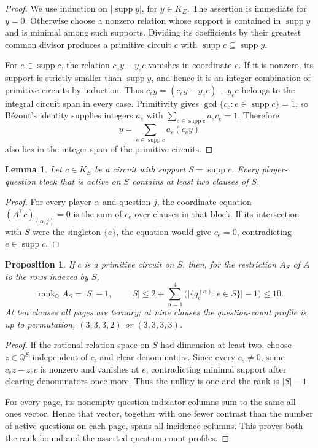 \documentclass[11pt]{article}
\newtheorem{proposition}[theorem]{Proposition}
\newtheorem{lemma}[theorem]{Lemma}
\theoremstyle{definition}
\theoremstyle{remark}
\newcommand{\Q}{\mathbb{Q}}
\newcommand{\supp}{\operatorname{supp}}
\newcommand{\rank}{\operatorname{rank}}
\newcommand{\card}[1]{\lvert #1\rvert}
\numberwithin{equation}{section}
\begin{document}
\begin{proof}
We use induction on \(\lvert\supp y\rvert\), for \(y\in K_E\).  The assertion
is immediate for \(y=0\).  Otherwise choose a nonzero relation whose support
is contained in \(\supp y\) and is minimal among such supports.  Dividing its
coefficients by their greatest common divisor produces a primitive circuit
\(c\) with \(\supp c\subseteq\supp y\).

For \(e\in\supp c\), the relation \(c_e y-y_e c\) vanishes in coordinate
\(e\).  If it is nonzero, its support is strictly smaller than \(\supp y\),
and hence it is an integer combination of primitive circuits by induction.
Thus \(c_e y=(c_e y-y_e c)+y_e c\) belongs to the integral circuit span in
every case.  Primitivity gives
\(\gcd\{c_e:e\in\supp c\}=1\), so B\'ezout's identity supplies integers
\(a_e\) with \(\sum_{e\in\supp c}a_e c_e=1\).  Therefore
\[
  y=\sum_{e\in\supp c}a_e(c_e y)
\]
also lies in the integer span of the primitive circuits.
\end{proof}

\begin{lemma}
\label{lem:no-singleton-block}
Let \(c\in K_E\) be a circuit with support \(S=\supp c\).  Every
player-question block that is active on \(S\) contains at least two clauses
of \(S\).
\end{lemma}

\begin{proof}
For every player \(\alpha\) and question \(j\), the coordinate equation
\((A^{\mathsf T}c)_{(\alpha,j)}=0\) is the sum of \(c_e\) over clauses in
that block.  If its intersection with \(S\) were the singleton \(\{e\}\),
the equation would give \(c_e=0\), contradicting \(e\in\supp c\).
\end{proof}

\begin{proposition}\label{prop:rank-cap}
If \(c\) is a primitive circuit on \(S\), then, for the restriction \(A_S\)
of \(A\) to the rows indexed by \(S\),
\[
  \rank_{\Q}A_S=\card S-1,
  \qquad
  \card S\leq
  2+\sum_{\alpha=1}^{4}
  \bigl(\card{\{q_e^{(\alpha)}:e\in S\}}-1\bigr)\leq10.
\]
At ten clauses all pages are ternary; at nine clauses the question-count
profile is, up to permutation, \((3,3,3,2)\) or \((3,3,3,3)\).
\end{proposition}

\begin{proof}
If the rational relation space on \(S\) had dimension at least two, choose
\(z\in\Q^S\) independent of \(c\), and clear denominators.  Since every
\(c_e\neq0\), some
\(c_e z-z_e c\) is nonzero and vanishes at \(e\), contradicting minimal
support after clearing denominators once more.  Thus the nullity is one and
the rank is \(\card S-1\).

For every page, its nonempty question-indicator columns sum to the same
all-ones vector.  Hence that vector, together with
one fewer contrast than the number of active questions on each page, spans
all incidence columns.  This proves both the rank bound and the asserted
question-count profiles.
\end{proof}
\end{document}
